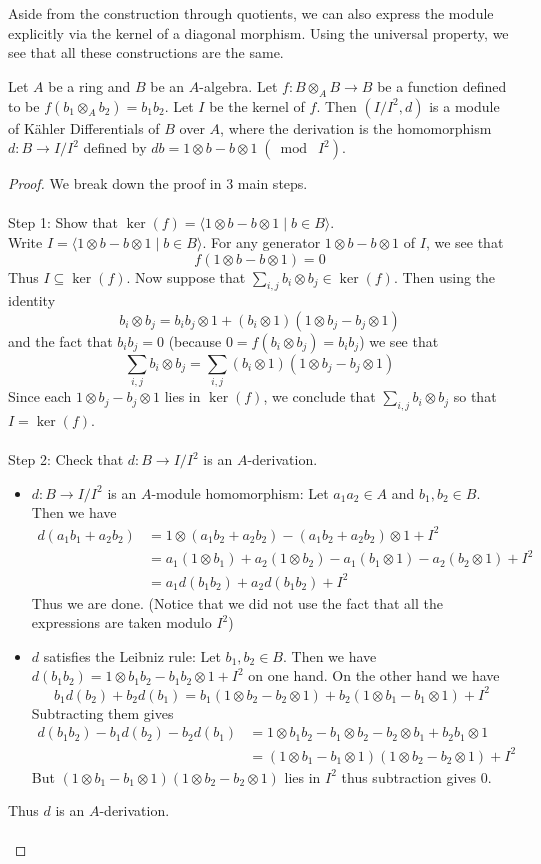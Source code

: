 \documentclass[a4paper]{article}
\begin{document}
Aside from the construction through quotients, we can also express the module explicitly via the kernel of a diagonal morphism. Using the universal property, we see that all these constructions are the same. 

\begin{prp}{}{} Let $A$ be a ring and $B$ be an $A$-algebra. Let $f:B\otimes_A B\to B$ be a function defined to be $f(b_1\otimes_A b_2)=b_1b_2$. Let $I$ be the kernel of $f$. Then $(I/I^2,d)$ is a module of Kähler Differentials of $B$ over $A$, where the derivation is the homomorphism $d:B\to I/I^2$ defined by $db=1\otimes b-b\otimes1\;(\bmod\;I^2)$. 
\begin{proof}
We break down the proof in 3 main steps. \\~\\
Step 1: Show that $\ker(f)=\langle 1\otimes b-b\otimes 1\;|\;b\in B\rangle$. \\
Write $I=\langle 1\otimes b-b\otimes 1\;|\;b\in B\rangle$. For any generator $1\otimes b-b\otimes 1$ of $I$, we see that $$f(1\otimes b-b\otimes 1)=0$$ Thus $I\subseteq\ker(f)$. Now suppose that $\sum_{i,j} b_i\otimes b_j\in\ker(f)$. Then using the identity $$b_i\otimes b_j=b_ib_j\otimes 1+(b_i\otimes 1)(1\otimes b_j-b_j\otimes 1)$$ and the fact that $b_ib_j=0$ (because $0=f(b_i\otimes b_j)=b_ib_j$) we see that $$\sum_{i,j} b_i\otimes b_j=\sum_{i,j}(b_i\otimes 1)(1\otimes b_j-b_j\otimes 1)$$ Since each $1\otimes b_j-b_j\otimes 1$ lies in $\ker(f)$, we conclude that $\sum_{i,j}b_i\otimes b_j$ so that $I=\ker(f)$. \\~\\
Step 2: Check that $d:B\to I/I^2$ is an $A$-derivation. \\
\begin{itemize}
\item $d:B\to I/I^2$ is an $A$-module homomorphism: Let $a_1a_2\in A$ and $b_1,b_2\in B$. Then we have 
\begin{align*}
d(a_1b_1+a_2b_2)&=1\otimes (a_1b_2+a_2b_2)-(a_1b_2+a_2b_2)\otimes 1+I^2\\
&=a_1(1\otimes b_1)+a_2(1\otimes b_2)-a_1(b_1\otimes 1)-a_2(b_2\otimes 1)+I^2\\
&=a_1d(b_1b_2)+a_2d(b_1b_2)+I^2
\end{align*}
Thus we are done. (Notice that we did not use the fact that all the expressions are taken modulo $I^2$)
\item $d$ satisfies the Leibniz rule: Let $b_1,b_2\in B$. Then we have $d(b_1b_2)=1\otimes b_1b_2-b_1b_2\otimes 1+I^2$ on one hand. On the other hand we have $$b_1d(b_2)+b_2d(b_1)=b_1(1\otimes b_2-b_2\otimes 1)+b_2(1\otimes b_1-b_1\otimes 1)+I^2$$ Subtracting them gives 
\begin{align*}
d(b_1b_2)-b_1d(b_2)-b_2d(b_1)&=1\otimes b_1b_2-b_1\otimes b_2-b_2\otimes b_1+b_2b_1\otimes 1\\
&=(1\otimes b_1-b_1\otimes 1)(1\otimes b_2-b_2\otimes 1)+I^2
\end{align*}
But $(1\otimes b_1-b_1\otimes 1)(1\otimes b_2-b_2\otimes 1)$ lies in $I^2$ thus subtraction gives $0$. 
\end{itemize}
Thus $d$ is an $A$-derivation. \\~\\


\end{proof}
\end{prp}
\end{document}

